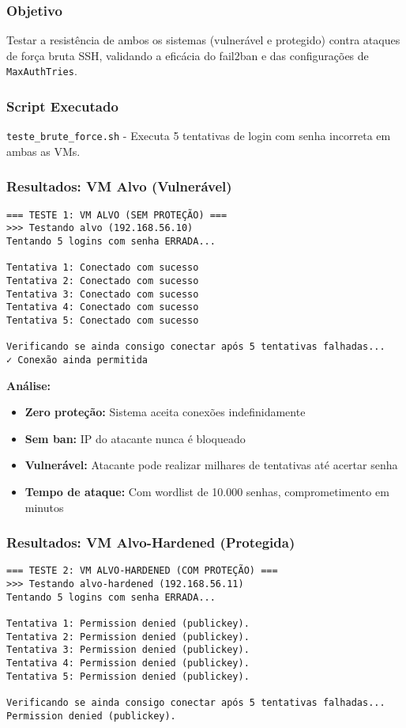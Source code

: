 \documentclass[12pt]{article}
\begin{document}
\subsubsection{Objetivo}
Testar a resistência de ambos os sistemas (vulnerável e protegido) contra ataques de força bruta SSH, validando a eficácia do fail2ban e das configurações de \texttt{MaxAuthTries}.

\subsubsection{Script Executado}
\texttt{teste\_brute\_force.sh} - Executa 5 tentativas de login com senha incorreta em ambas as VMs.

\subsubsection{Resultados: VM Alvo (Vulnerável)}

\begin{verbatim}
=== TESTE 1: VM ALVO (SEM PROTEÇÃO) ===
>>> Testando alvo (192.168.56.10)
Tentando 5 logins com senha ERRADA...

Tentativa 1: Conectado com sucesso
Tentativa 2: Conectado com sucesso
Tentativa 3: Conectado com sucesso
Tentativa 4: Conectado com sucesso
Tentativa 5: Conectado com sucesso

Verificando se ainda consigo conectar após 5 tentativas falhadas...
✓ Conexão ainda permitida
\end{verbatim}

\textbf{Análise:}
\begin{itemize}
    \item \textbf{Zero proteção:} Sistema aceita conexões indefinidamente
    \item \textbf{Sem ban:} IP do atacante nunca é bloqueado
    \item \textbf{Vulnerável:} Atacante pode realizar milhares de tentativas até acertar senha
    \item \textbf{Tempo de ataque:} Com wordlist de 10.000 senhas, comprometimento em minutos
\end{itemize}

\subsubsection{Resultados: VM Alvo-Hardened (Protegida)}

\begin{verbatim}
=== TESTE 2: VM ALVO-HARDENED (COM PROTEÇÃO) ===
>>> Testando alvo-hardened (192.168.56.11)
Tentando 5 logins com senha ERRADA...

Tentativa 1: Permission denied (publickey).
Tentativa 2: Permission denied (publickey).
Tentativa 3: Permission denied (publickey).
Tentativa 4: Permission denied (publickey).
Tentativa 5: Permission denied (publickey).

Verificando se ainda consigo conectar após 5 tentativas falhadas...
Permission denied (publickey).
\end{verbatim}
\end{document}
